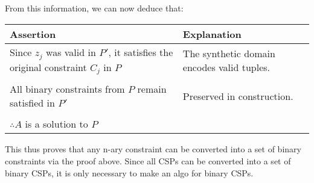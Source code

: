 \documentclass[11pt]{article}
\newenvironment{answercols}
  {\begin{center}\begin{tabular}{p{0.45\textwidth}p{0.45\textwidth}}
   \toprule
   \textbf{Assertion} & \textbf{Explanation} \\
   \midrule}
  {\\ \bottomrule\end{tabular}\end{center}}
\begin{document}
    From this information, we can now deduce that:

    \begin{answercols}
        Since $z_j$ was valid in $P'$, it satisfies the original constraint $C_j$ in $P$ &
        The synthetic domain encodes valid tuples. \\
        \\
        All binary constraints from $P$ remain satisfied in $P'$ &
        Preserved in construction. \\
        \\
        $\therefore A$ is a solution to $P$
    \end{answercols}

    \newpage

    \noindent This thus proves that any n-ary constraint can be converted into a set of binary constraints via the proof above. Since all CSPs can be converted into a set of binary CSPs, it is only necessary to make an algo for binary CSPs. \\
\end{document}
